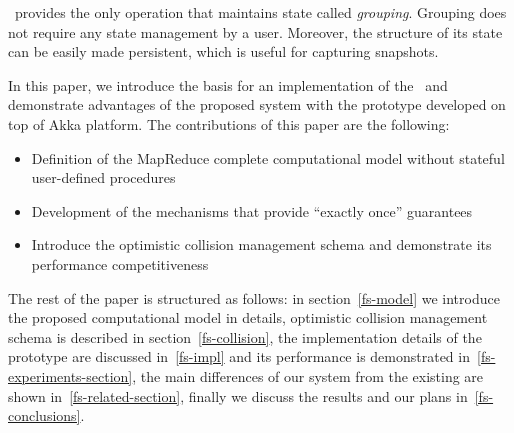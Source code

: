 \FlameStream\ provides the only operation that maintains state called {\it grouping}. Grouping does not require any state management by a user. Moreover, the structure of its state can be easily made persistent, which is useful for capturing snapshots.

In this paper, we introduce the basis for an implementation of the \FlameStream\ and demonstrate advantages of the proposed system with the prototype developed on top of Akka platform. The contributions of this paper are the following:

\begin {itemize}
\item Definition of the MapReduce complete computational model without stateful user-defined procedures
\item Development of the mechanisms that provide ``exactly once'' guarantees
\item Introduce the optimistic collision management schema and demonstrate its performance competitiveness
\end {itemize}

The rest of the paper is structured as follows: in section~\ref{fs-model} we introduce the proposed computational model in details, optimistic collision management schema is described in section~\ref{fs-collision}, the implementation details of the prototype are discussed in~\ref{fs-impl} and its performance is demonstrated in~\ref{fs-experiments-section}, the main differences of our system from the existing are shown in~\ref{fs-related-section}, finally we discuss the results and our plans in~\ref{fs-conclusions}.

\endinput
